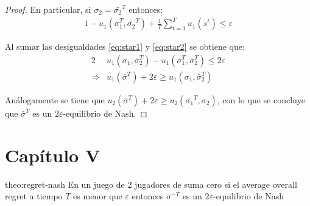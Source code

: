 \begin{proof}
En particular, si $\sigma_2 = \bar{\sigma_2}^T$ entonces:
\begin{alignat}{1}
\label{eq:star2}
-u_1(\bar{\sigma}_1^T, \bar{\sigma_2}^T) + \frac{1}{T} \sum_{t=1}^T u_1(s^t) \leq \varepsilon
\end{alignat}

Al sumar las desigualdades \ref{eq:star1} y \ref{eq:star2} se obtiene que:
\begin{alignat}{2}
& u_1(\sigma_1, \bar{\sigma}_2^T) - u_1(\bar{\sigma}_1^T, \bar{\sigma}_2^T) \leq 2\varepsilon \\
\Rightarrow & u_1(\bar{\sigma}^T) + 2\varepsilon \geq u_1(\sigma_1, \bar{\sigma}_2^T)
\end{alignat}

Análogamente se tiene que $u_2(\bar{\sigma}^T) + 2\varepsilon \geq u_2(\bar{\sigma_1}^T, \sigma_2)$, con lo que se concluye que $\bar{\sigma}^T$ es un $2\varepsilon$-equilibrio de Nash.
\end{proof}


\section*{Capítulo V}

\begin{reptheorem}{theo:regret-nash}
En un juego de $2$ jugadores de suma cero si el average overall regret a tiempo $T$ es menor que $\varepsilon$ entonces $\sigma^{-T}$ es un $2\varepsilon$-equilibrio de Nash
\end{reptheorem}

